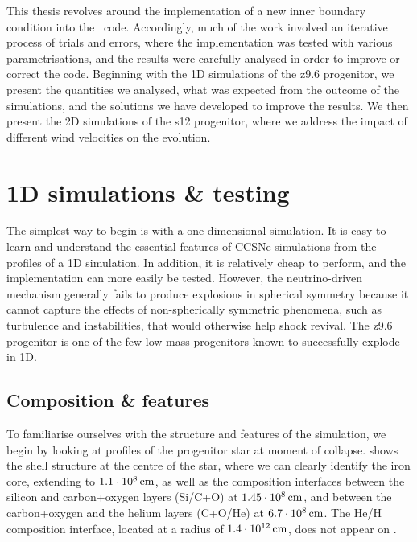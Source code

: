 \label{chap:results}


This thesis revolves around the implementation of a new inner boundary condition into the \flash\ code. Accordingly, much of the work involved an iterative process of trials and errors, where the implementation was tested with various parametrisations, and the results were carefully analysed in order to improve or correct the code. Beginning with the 1D simulations of the z9.6 progenitor, we present the quantities we analysed, what was expected from the outcome of the simulations, and the solutions we have developed to improve the results. We then present the 2D simulations of the s12 progenitor, where we address the impact of different wind velocities on the evolution.

\section{1D simulations \& testing} \label{sec:results_1d}

The simplest way to begin is with a one-dimensional simulation. It is easy to learn and understand the essential features of CCSNe simulations from the profiles of a 1D simulation. In addition, it is relatively cheap to perform, and the implementation can more easily be tested. However, the neutrino-driven mechanism generally fails to produce explosions in spherical symmetry because it cannot capture the effects of non-spherically symmetric phenomena, such as turbulence and instabilities, that would otherwise help shock revival. The z9.6 progenitor is one of the few low-mass progenitors known to successfully explode in 1D.

\clearpage

\subsection{Composition \& features} \label{sec:results_features}

To familiarise ourselves with the structure and features of the simulation, we begin by looking at profiles of the progenitor star at moment of collapse.  shows the shell structure at the centre of the star, where we can clearly identify the iron core, extending to \(1.1 \cdot 10^8\,\mathrm{cm}\), as well as the composition interfaces between the silicon and carbon+oxygen layers (Si/C+O) at \(1.45 \cdot 10^8\,\mathrm{cm}\), and between the carbon+oxygen and the helium layers (C+O/He) at \(6.7 \cdot 10^8\,\mathrm{cm}\). The He/H composition interface, located at a radius of \(1.4 \cdot 10^{12}\,\mathrm{cm}\), does not appear on .

